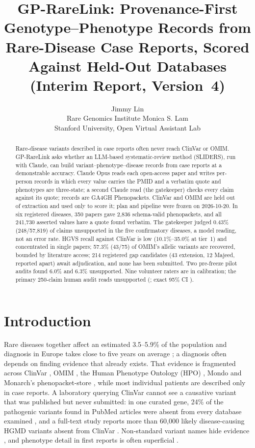 \documentclass{article} %
\title{GP-RareLink: Provenance-First Genotype--Phenotype Records from Rare-Disease Case Reports, Scored Against Held-Out Databases (Interim Report, Version~4)}
\author{Jimmy Lin \\
Rare Genomics Institute
\And
Monica S. Lam \\
Stanford University, Open Virtual Assistant Lab
}
\begin{document}
\maketitle

\begin{abstract}
Rare-disease variants described in case reports often never reach ClinVar or OMIM. GP-RareLink asks whether an LLM-based systematic-review method (SLIDERS), run with Claude, can build variant--phenotype--disease records from case reports at a demonstrable accuracy. Claude Opus reads each open-access paper and writes per-person records in which every value carries the PMID and a verbatim quote and phenotypes are three-state; a second Claude read (the gatekeeper) checks every claim against its quote; records are GA4GH Phenopackets. ClinVar and OMIM are held out of extraction and used only to score it; plan and pipeline were frozen on 2026-10-20. In six registered diseases, 350 papers gave 2,836 schema-valid phenopackets, and all 241,730 asserted values have a quote found verbatim. The gatekeeper judged 0.43\% (248/57,819) of claims unsupported in the five confirmatory diseases, a model reading, not an error rate. HGVS recall against ClinVar is low (10.1\%--35.0\% at tier~1) and concentrated in single papers; 57.3\% (43/75) of OMIM's allelic variants are recovered, bounded by literature access; 214 registered gap candidates (43 extension, 12 Majeed, reported apart) await adjudication, and none has been submitted. Two pre-freeze pilot audits found 6.0\% and 6.3\% unsupported. Nine volunteer raters are in calibration; the primary 250-claim human audit reads  unsupported (; exact 95\% CI ).
\end{abstract}

\section{Introduction}
\label{sec:intro}
Rare diseases together affect an estimated 3.5--5.9\% of the population \citep{Wakap2019EstimatingCumulative} and diagnosis in Europe takes close to five years on average \citep{Faye2024TimeDiagnosis}; a diagnosis often depends on finding evidence that already exists. That evidence is fragmented across ClinVar \citep{landrum2025_clinvar}, OMIM \citep{amberger2019_omim}, the Human Phenotype Ontology (HPO) \citep{gargano2024_hpo}, Mondo \citep{vasilevsky2025_mondo} and Monarch's phenopacket-store \citep{danis2025_phenopacket_store}, while most individual patients are described only in case reports. A laboratory querying ClinVar cannot see a causative variant that was published but never submitted: in one curated gene, 24\% of the pathogenic variants found in PubMed articles were absent from every database examined \citep{Lyons2023RareDisease}, and a full-text study reports more than 60,000 likely disease-causing HGMD variants absent from ClinVar \citep{birgmeier2020_avada}. Non-standard variant names hide evidence \citep{freeman2024_vv_literature,lansdon2026_nomenclature_errors}, and phenotype detail in first reports is often superficial \citep{almail2024_reporting_gaps}.
\end{document}
